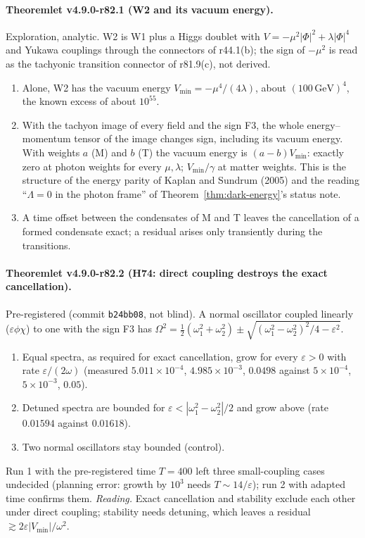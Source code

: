 \paragraph{Theoremlet v4.9.0-r82.1 (W2 and its vacuum energy).}
Exploration, analytic.  W2 is W1 plus a Higgs doublet with \(V=-\mu^2|\Phi|^2+\lambda|\Phi|^4\) and Yukawa couplings through the
connectors of r44.1(b); the sign of \(-\mu^2\) is read as the tachyonic transition connector of r81.9(c), not derived.
\begin{enumerate}[leftmargin=2em]
\item[(a)] Alone, W2 has the vacuum energy \(V_{\min}=-\mu^4/(4\lambda)\), about \((100\,\mathrm{GeV})^4\), the known excess of about \(10^{55}\).
\item[(b)] With the tachyon image of every field and the sign F3, the whole energy--momentum tensor of the image changes sign,
including its vacuum energy.  With weights \(a\) (M) and \(b\) (T) the vacuum energy is \((a-b)V_{\min}\): exactly zero at photon
weights for every \(\mu,\lambda\); \(V_{\min}/\gamma\) at matter weights.  This is the structure of the energy parity of Kaplan and
Sundrum (2005) and the reading ``\(\Lambda=0\) in the photon frame'' of Theorem~\ref{thm:dark-energy}'s status note.
\item[(c)] A time offset between the condensates of M and T leaves the cancellation of a formed condensate exact; a residual
arises only transiently during the transitions.
\end{enumerate}

\paragraph{Theoremlet v4.9.0-r82.2 (H74: direct coupling destroys the exact cancellation).}
Pre-registered (commit \texttt{b24bb08}, not blind).  A normal oscillator coupled linearly (\(\varepsilon\phi\chi\)) to one with the sign
F3 has \(\Omega^2=\tfrac12(\omega_1^2+\omega_2^2)\pm\sqrt{(\omega_1^2-\omega_2^2)^2/4-\varepsilon^2}\).
\begin{enumerate}[leftmargin=2em]
\item[(a)] Equal spectra, as required for exact cancellation, grow for every \(\varepsilon>0\) with rate \(\varepsilon/(2\omega)\) (measured
\(5.011\times10^{-4}\), \(4.985\times10^{-3}\), \(0.0498\) against \(5\times10^{-4}\), \(5\times10^{-3}\), \(0.05\)).
\item[(b)] Detuned spectra are bounded for \(\varepsilon<|\omega_1^2-\omega_2^2|/2\) and grow above (rate \(0.01594\) against \(0.01618\)).
\item[(c)] Two normal oscillators stay bounded (control).
\end{enumerate}
Run 1 with the pre-registered time \(T=400\) left three small-coupling cases undecided (planning error: growth by \(10^3\) needs
\(T\sim14/\varepsilon\)); run 2 with adapted time confirms them.  \emph{Reading.}  Exact cancellation and stability exclude each other
under direct coupling; stability needs detuning, which leaves a residual \(\gtrsim2\varepsilon|V_{\min}|/\omega^2\).

